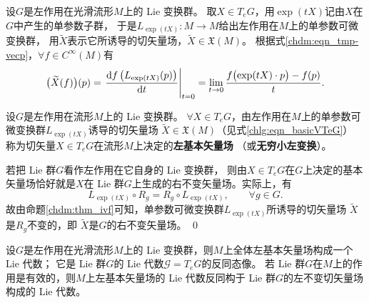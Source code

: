 设$G$是左作用在光滑流形$M$上的 Lie 变换群。
取$X \in T_e G$，用$\exp(tX)$记由$X$在$G$中产生的单参数子群，
于是$L_{\exp(tX)}: M \rightarrow M$给出左作用在$M$上的单参数可微变换群，
用$\widetilde{X}$表示它所诱导的切矢量场，$\widetilde{X} \in \mathfrak{X}(M)$。
根据式\eqref{chdm:eqn_tmp-vecp}，$\forall f \in C^{\infty}(M)$有
\begin{equation}\label{chlg:eqn_basicVTeG}
    \bigl(\widetilde{X}(f)\bigr)(p) = \left.\frac{\dd f\left(L_{\exp(tX)}(p)\right)}{\dd t}\right|_{t=0}
    =\lim _{t \rightarrow 0} \frac{f\bigl(\exp(tX)\cdot p\bigr)-f(p)}{t} .
\end{equation}

\begin{definition}\label{chlg:def_left-basicV}
    设$G$是左作用在流形$M$上的 Lie 变换群。
    $\forall X \in T_e G$，由左作用在$M$上的单参数可微变换群$L_{\exp (t  X)}$诱导的切矢量场
    $\widetilde{X} \in \mathfrak{X}(M)$（见式\eqref{chlg:eqn_basicVTeG}）
    称为切矢量$X \in T_e G$在流形$M$上决定的\textbf{左基本矢量场}
    （或\textbf{无穷小左变换}）。
\end{definition}

\begin{example}
    若把 Lie 群$G$看作左作用在它自身的 Lie 变换群，
    则由$X \in T_e G$在$G$上决定的基本矢量场恰好就是$X$在
     Lie 群$G$上生成的右不变矢量场。实际上，有
    \begin{equation}
        L_{\exp (t X)} \circ R_g = R_g \circ L_{\exp (t X)},\qquad \forall g \in G.
    \end{equation}
    故由命题\ref{chdm:thm_ivf}可知，单参数可微变换群$L_{\exp(t X)}$所诱导的切矢量场
    $\widetilde{X}$是$R_{g}$不变的，即 $\widetilde{X}$是$G$的右不变矢量场。 \qed
\end{example}

\begin{theorem}\label{chlg:thm_liegaeb}
    设$G$是左作用在光滑流形$M$上的 Lie 变换群，则$M$上全体左基本矢量场构成一个 Lie 代数；
    它是 Lie 群$G$的 Lie 代数$\mathscr{G}= T_e G$的{反}同态像。
    若 Lie 群$G$在$M$上的作用是有效的，则$M$上左基本矢量场的 Lie 代数{反}同构于
     Lie 群$G$的左不变切矢量场构成的 Lie 代数。
\end{theorem}

